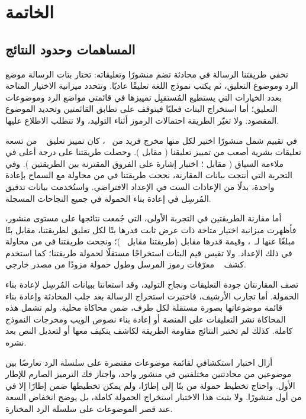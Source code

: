 \section{الخاتمة}
\label{sec:conclusion}

\subsection{المساهمات وحدود النتائج}

تخفي طريقتنا الرسالة في محادثة تضم منشورًا وتعليقاته: تختار بتات الرسالة موضع الرد وموضوع التعليق، ثم يكتب نموذج اللغة تعليقًا عاديًا.
وتتحدد ميزانية الاختيار المتاحة بعدد الخيارات التي يستطيع المُستقبِل تمييزها في قائمتي مواضع الرد وموضوعات التعليق؛ أما استخراج البتات فعليًا فيتوقف على تطابق القائمتين وتحديد الموضوع المقصود.
ولا تغيّر الطريقة احتمالات الرموز أثناء التوليد، ولا تتطلب الاطلاع عليها.

في تقييم شمل  منشورًا اختير لكل منها مخرج فريد من ~\cite{lin2024zero}، كان تمييز تعليق ~\cite{lin2024zero} من تسعة تعليقات بشرية أصعب من تمييز تعليقنا ( مقابل ). وحصلت طريقتنا على درجة أعلى في ملاءمة السياق ( مقابل ؛ اختبار إشارة على الفروق المقترنة بين الطريقتين ).
وفي التجربة التي أنتجت بيانات المقارنة، نجحت طريقتنا في  من  محاولة مع السماح بإعادة واحدة، بدلًا من الإعادات الست في الإعداد الافتراضي. واستُخدمت بيانات تدقيق المُرسِل في إعادة بناء الحمولة في جميع النجاحات المسجلة.

أما مقارنة الطريقتين في التجربة الأولى، التي جُمعت نتائجها على مستوى  منشور، فأظهرت ميزانية اختيار متاحة ذات عرض ثابت قدرها  بتًا لكل تعليق لطريقتنا، مقابل  بتًا مبلغًا عنها لـ~\cite{lin2024zero}، وقيمة  قدرها  مقابل  (طريقتنا مقابل ~\cite{lin2024zero})؛ ونجحت طريقتنا في  من  محاولة في ذلك الإعداد. ولا تقيس قيم البتات استخراجًا مستقلًا لحمولة طريقتنا؛ كما استخدم كشف ~\cite{lin2024zero} معرّفات رموز المرسل وطول حمولة مزودًا من مصدر خارجي.

تصف المقارنتان جودة التعليقات ونجاح التوليد، وقد استعانتا ببيانات المُرسِل لإعادة بناء الحمولة. أما تجارب الأرشيف، فاختبرت استخراج الرسالة بعد جلب المحادثة وإعادة بناء قائمة موضوعاتها بصورة مستقلة لكل طرف، ضمن محاكاة محلية. ولم تشمل هذه المحاكاة نشر التعليقات على المنصة أو إعادة بناء نصوص الويب ومخرجات النموذج كاملة. كذلك لم تختبر النتائج مقاومة الطريقة لكاشف يتكيف معها أو لتعديل النص بعد نشره.

أزال اختبار استكشافي لقائمة موضوعات مقتصرة على سلسلة الرد تعارضًا بين موضوعين من محادثتين مختلفتين في منشور واحد، واجتاز فك الترميز الصارم للإطار الأول.
واحتاج تخطيط حمولة من  بتًا إلى  إطارًا، ولم يمكن تخطيطها ضمن  إطارًا إلا في  من أول  منشورًا.
ولا يثبت هذا الاختبار استخراج الحمولة كاملة، بل يوضح انخفاض السعة عند قصر الموضوعات على سلسلة الرد المختارة.

